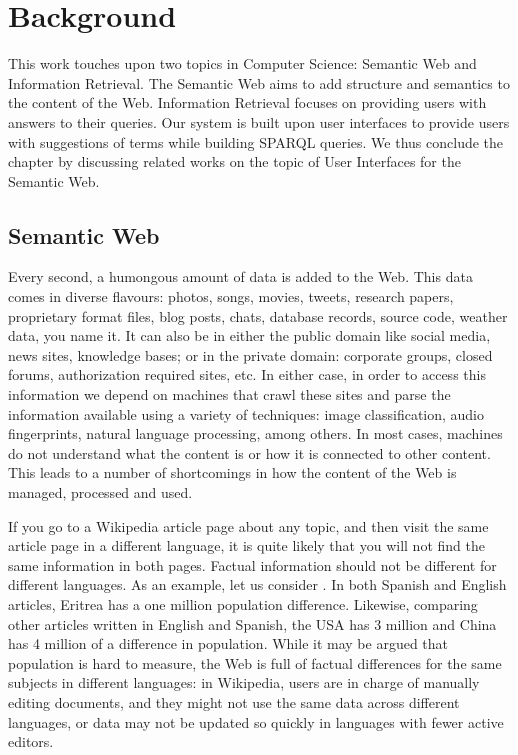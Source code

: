 \chapter{Background}
\label{chap:background}

This work touches upon two topics in Computer Science: Semantic Web and Information Retrieval. The Semantic Web aims to add structure and semantics to the content of the Web. Information Retrieval focuses on providing users with answers to their queries. Our system is built upon user interfaces to provide users with suggestions of terms while building SPARQL queries. We thus conclude the chapter by discussing related works on the topic of User Interfaces for the Semantic Web.


\section{Semantic Web}

Every second, a humongous amount of data is added to the Web. This data comes in diverse flavours: photos, songs, movies, tweets, research papers, proprietary format files, blog posts, chats, database records, source code, weather data, you name it. It can also be in either the public domain like social media, news sites, knowledge bases; or in the private domain: corporate groups, closed forums, authorization required sites, etc. In either case, in order to access this information we depend on machines that crawl these sites and parse the information available using a variety of techniques: image classification, audio fingerprints, natural language processing, among others. In most cases, machines do not understand what the content is or how it is connected to other content. This leads to a number of shortcomings in how the content of the Web is managed, processed and used.

If you go to a Wikipedia article page about any topic, and then visit the same article page in a different language, it is quite likely that you will not find the same information in both pages. Factual information should not be different for different languages. As an example, let us consider . In both Spanish and English articles, Eritrea has a one million population difference. Likewise, comparing other articles written in English and Spanish, the USA has 3 million and China has 4 million of a difference in population. While it may be argued that population is hard to measure, the Web is full of factual differences for the same subjects in different languages: in Wikipedia, users are in charge of manually editing documents, and they might not use the same data across different languages, or data may not be updated so quickly in languages with fewer active editors.

